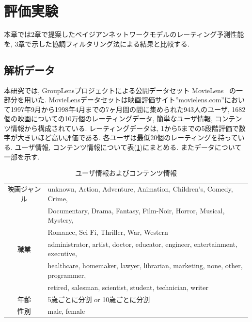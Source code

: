 \documentclass[a4j,12pt]{jarticle}
\begin{document}
\section{評価実験}

本章では2章で提案したベイジアンネットワークモデルのレーティング予測性能を, 3章で示した協調フィルタリング法による結果と比較する.

\subsection{解析データ}

本研究では, GroupLensプロジェクトによる公開データセット MovieLens~\cite{MovieLens} の一部分を用いた. MovieLensデータセットは映画評価サイト''movielens.com''において1997年9月から1998年4月までの7ヶ月間の間に集められた943人のユーザ, 1682個の映画についての10万個のレーティングデータ, 簡単なユーザ情報, コンテンツ情報から構成されている. レーティングデータは, 1から5までの5段階評価で数字が大きいほど高い評価である. 各ユーザは最低20個のレーティングを持っている. ユーザ情報, コンテンツ情報について表(\ref{MovieLens})にまとめる. またデータについて一部を示す.

\begin{table}[H]
\begin{center}
\caption{ユーザ情報およびコンテンツ情報}   %
\label{MovieLens}   %
\begin{tabular}{c l}
\hline
映画ジャンル & unknown, Action, Adventure, Animation, Children's, Comedy, Crime, \\
                 & Documentary, Drama, Fantasy, Film-Noir, Horror, Musical, Mystery, \\
                 & Romance, Sci-Fi, Thriller, War, Western \\
職業          & administrator, artist, doctor, educator, engineer, entertainment, executive, \\
                & healthcare, homemaker, lawyer, librarian, marketing, none, other, programmer, \\
                & retired, salesman, scientist, student, technician, writer \\
年齢 & 5歳ごとに分割 or 10歳ごとに分割 \\
性別 & male, female\\ 
\hline
\end{tabular}
\end{center}
\end{table}
\end{document}
